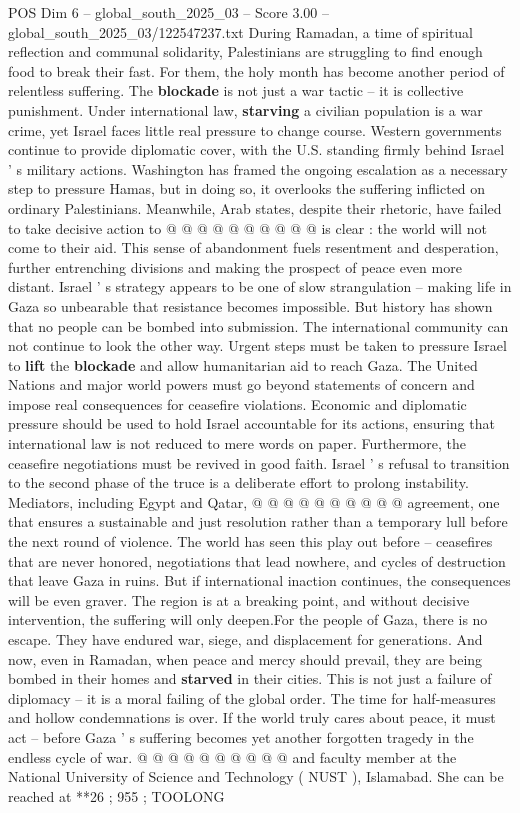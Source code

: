 \begin{textsample}{POS Dim 6 – global\_south\_2025\_03 – Score 3.00 – global\_south\_2025\_03/122547237.txt}
During Ramadan, a time of spiritual reflection and communal solidarity, Palestinians are struggling to find enough food to break their fast.
For them, the holy month has become another period of relentless suffering.
The \textbf{blockade} is not just a war tactic -- it is collective punishment.
Under international law, \textbf{starving} a civilian population is a war crime, yet Israel faces little real pressure to change course.
Western governments continue to provide diplomatic cover, with the U.S. standing firmly behind Israel ' s military actions.
Washington has framed the ongoing escalation as a necessary step to pressure Hamas, but in doing so, it overlooks the suffering inflicted on ordinary Palestinians.
Meanwhile, Arab states, despite their rhetoric, have failed to take decisive action to @ @ @ @ @ @ @ @ @ @ is clear : the world will not come to their aid.
This sense of abandonment fuels resentment and desperation, further entrenching divisions and making the prospect of peace even more distant.
Israel ' s strategy appears to be one of slow strangulation -- making life in Gaza so unbearable that resistance becomes impossible.
But history has shown that no people can be bombed into submission.
The international community can not continue to look the other way.
Urgent steps must be taken to pressure Israel to \textbf{lift} the \textbf{blockade} and allow humanitarian aid to reach Gaza.
The United Nations and major world powers must go beyond statements of concern and impose real consequences for ceasefire violations.
Economic and diplomatic pressure should be used to hold Israel accountable for its actions, ensuring that international law is not reduced to mere words on paper.
Furthermore, the ceasefire negotiations must be revived in good faith.
Israel ' s refusal to transition to the second phase of the truce is a deliberate effort to prolong instability.
Mediators, including Egypt and Qatar, @ @ @ @ @ @ @ @ @ @ agreement, one that ensures a sustainable and just resolution rather than a temporary lull before the next round of violence.
The world has seen this play out before -- ceasefires that are never honored, negotiations that lead nowhere, and cycles of destruction that leave Gaza in ruins.
But if international inaction continues, the consequences will be even graver.
The region is at a breaking point, and without decisive intervention, the suffering will only deepen.For the people of Gaza, there is no escape.
They have endured war, siege, and displacement for generations.
And now, even in Ramadan, when peace and mercy should prevail, they are being bombed in their homes and \textbf{starved} in their cities.
This is not just a failure of diplomacy -- it is a moral failing of the global order.
The time for half-measures and hollow condemnations is over.
If the world truly cares about peace, it must act -- before Gaza ' s suffering becomes yet another forgotten tragedy in the endless cycle of war. @ @ @ @ @ @ @ @ @ @ and faculty member at the National University of Science and Technology ( NUST ), Islamabad.
She can be reached at **26 ; 955 ; TOOLONG

\end{textsample}
